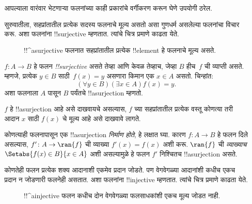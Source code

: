 \documentclass[../../../include/open-logic-section]{subfiles}
\begin{document}

\begin{explain}
आपल्याला वारंवार भेटणाऱ्या फलनांच्या काही प्रकारांचे वर्गीकरण करून
घेणे उपयोगी ठरेल.

सुरुवातीला, सहप्रांतातील प्रत्येक सदस्य फलनाचे मूल्य असतो असा गुणधर्म
असलेल्या फलनांचा विचार करू. अशा फलनांना !!{surjective} म्हणतात.
त्यांचे चित्र  प्रमाणे काढता येते.

\begin{figure}
  \caption{!!^a{surjective} फलनात सहप्रांतातील प्रत्येक !!{element}
    हे फलनाचे मूल्य असते.}
\end{figure}
\end{explain}

\begin{defn}
$f \colon A \rightarrow B$ हे फलन \emph{!!{surjective}} असते तेव्हा
आणि केवळ तेव्हाच, जेव्हा $B$ हीच~$f$ ची व्याप्ती असते. म्हणजे,
प्रत्येक $y \in B$ साठी~$f(x) = y$ असणारा किमान एक $x \in A$
असतो. चिन्हांत:
\[
  (\forall y \in B)(\exists x \in A)f(x) = y.
\]
अशा फलनाला $A$ पासून $B$ पर्यंतचे !!a{surjection} म्हणतो.
\end{defn}

\begin{explain}
$f$ हे !!a{surjection} आहे असे दाखवायचे असल्यास, $f$ च्या सहप्रांतातील
प्रत्येक वस्तू कोणत्या तरी आदान $x$ साठी $f(x)$ चे मूल्य आहे असे दाखवावे लागते.

कोणत्याही फलनापासून एक !!a{surjection} \emph{निर्माण होते}, हे लक्षात घ्या.
कारण $f \colon A \to B$ हे फलन दिले असल्यास, $f' \colon A \to \ran{f}$
ची व्याख्या $f'(x) = f(x)$ अशी करू. $\ran{f}$ ची \emph{व्याख्याच}
$\Setabs{f(x) \in B}{x \in A}$ अशी असल्यामुळे हे फलन $f'$ निश्चितच
!!a{surjection} असते.
\end{explain}

\begin{explain}
कोणतेही फलन प्रत्येक शक्य आदानाशी एकमेव प्रदान जोडते. पण वेगवेगळ्या
आदानांशी कधीच एकच प्रदान न जोडणारी फलनेही असतात. अशा फलनांना
!!{injective} म्हणतात. त्यांचे चित्र  प्रमाणे काढता येते.
\begin{figure}
  \caption{!!^a{injective} फलन कधीच दोन वेगवेगळ्या फलसाधकांशी
    एकच मूल्य जोडत नाही.}
\end{figure}
\end{explain}
\end{document}
